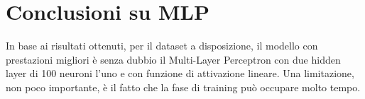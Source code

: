 \section{Conclusioni su MLP}
In base ai risultati ottenuti, per il dataset a disposizione, il modello con prestazioni migliori è senza dubbio il Multi-Layer Perceptron con due hidden layer di 100 neuroni l'uno e con funzione di attivazione lineare. Una limitazione, non poco importante, è il fatto che la fase di training può occupare molto tempo.